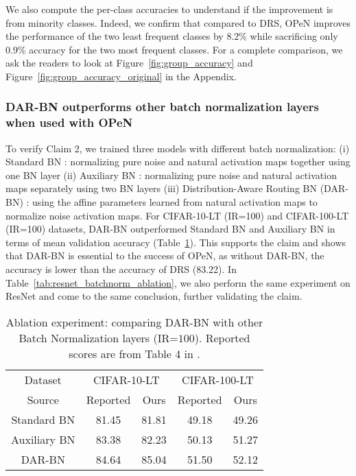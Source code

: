 We also compute the per-class accuracies to understand if the improvement is from minority classes. Indeed, we confirm that compared to DRS, OPeN improves the performance of the two least frequent classes by 8.2\% while sacrificing only 0.9\% accuracy for the two most frequent classes. For a complete comparison, we ask the readers to look at Figure~\ref{fig:group_accuracy} and Figure~\ref{fig:group_accuracy_original} in the Appendix.



\subsubsection{DAR-BN outperforms other batch normalization layers when used with OPeN}

To verify Claim 2, we trained three models with different batch normalization: (i) Standard BN \citep{BatchNorm}: normalizing pure noise and natural activation maps together using one BN layer (ii) Auxiliary BN \citep{AuxBN}: normalizing pure noise and natural activation maps separately using two BN layers (iii) Distribution-Aware Routing BN (DAR-BN) \citep{PureNoise}: using the affine parameters learned from natural activation maps to normalize noise activation maps. For CIFAR-10-LT (IR=100) and CIFAR-100-LT (IR=100) datasets, DAR-BN outperformed Standard BN and Auxiliary BN in terms of mean validation accuracy (Table~\ref{tab:batchnorm_ablation}). This supports the claim and shows that DAR-BN is essential to the success of OPeN, as without DAR-BN, the accuracy is lower than the accuracy of DRS (83.22). In Table~\ref{tab:resnet_batchnorm_ablation}, we also perform the same experiment on ResNet and come to the same conclusion, further validating the claim.

\begin{table}[!ht]
    \centering
    \begin{tabular}{c|cc|cc}
        Dataset & \multicolumn{2}{c|}{CIFAR-10-LT} & \multicolumn{2}{c}{CIFAR-100-LT} \\
        Source & Reported \citep{PureNoise} & \;\;\;\;\;Ours\;\;\;\;\; & Reported \citep{PureNoise} & \;\;\;\;\;Ours\;\;\;\;\; \\
        \hline
        Standard BN \citep{BatchNorm} & 81.45 & 81.81 & 49.18 & 49.26 \\
        Auxiliary BN \citep{AuxBN} & 83.38 & 82.23 & 50.13 & 51.27 \\
        DAR-BN \citep{PureNoise} & 84.64 & 85.04 & 51.50 & 52.12 \\
    \end{tabular}
    \caption{Ablation experiment: comparing DAR-BN with other Batch Normalization layers (IR=$100$). Reported scores are from Table 4 in \citet{PureNoise}.}
    \label{tab:batchnorm_ablation}
\end{table}

